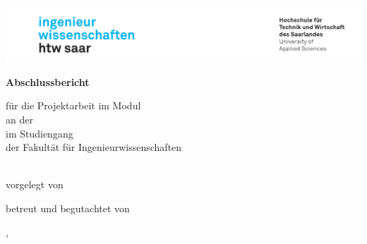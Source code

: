 \begin{titlepage}\linespread{1.5}\selectfont
\includegraphics[width=\linewidth]{Graphics/htwsaar_Logo_inwi_head_VF_4C_crop}
  \begin{center}
    \large  
    \hfill
    \vfill
    \begingroup
      \Large\bfseries Abschlussbericht 
    \endgroup
		
		\bigskip
	für die Projektarbeit im Modul \myModule \\
    an der \myUni \\
    im Studiengang \myDegreeCourse \\
    der Fakultät für Ingenieurwissenschaften \\ 
    
  \vfill
	
  \begingroup
    \Large\bfseries\myTitle 
  \endgroup
	
	\bigskip
	
  vorgelegt von \\
  \bigskip
  \myName

  \vfill
	
  betreut und begutachtet von \\
  \myFirstProf
  
  \vfill
	
  \myLocation, \myTime                   

    \end{center}       
\end{titlepage}   
